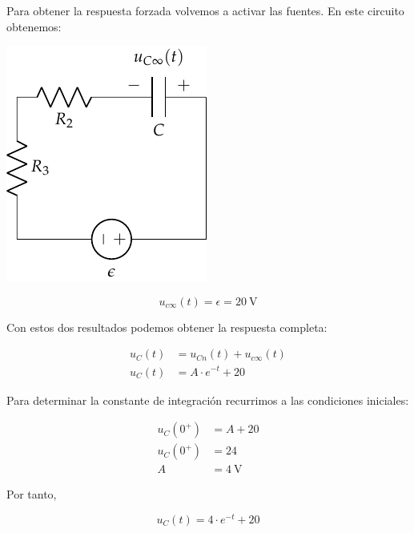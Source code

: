 \documentclass[12pt]{article}
\begin{document}
Para obtener la respuesta forzada volvemos a activar las fuentes. En
este circuito obtenemos:

\begin{minipage}{0.3\textwidth}
  \includegraphics{figs/FM_4_3_forzada}
\end{minipage}
\begin{minipage}{0.7\textwidth}
  \begin{equation*}
    u_{c\infty}(t) = \epsilon = \SI{20}{\volt}
  \end{equation*}
\end{minipage}

Con estos dos resultados podemos obtener la respuesta completa:

\begin{align*}
  u_C(t) &= u_{Cn}(t) + u_{c\infty}(t)\\
  u_C(t) &= A \cdot e^{-t} + 20
\end{align*}

Para determinar la constante de integración recurrimos a las
condiciones iniciales:

\begin{align*}
  u_C(0^+) &= A + 20\\
  u_C(0^+) &= 24\\
  A &= \SI{4}{\volt}
\end{align*}

Por tanto,

\begin{equation*}
  u_C(t) = 4 \cdot e^{-t} + 20
\end{equation*}

\clearpage

\subsection{}
\end{document}
